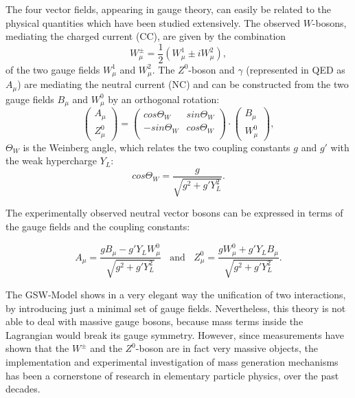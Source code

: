 The four vector fields, appearing in gauge theory, can easily be related to the physical quantities which have been studied extensively. 
The observed $W$-bosons, mediating the charged current (CC), are given by the combination
\begin{equation}\label{EWtrafo1}
 W^{\pm}_\mu = \frac{1}{2}(W^{1}_\mu\pm iW^{2}_\mu),
\end{equation}
of the two gauge fields $W^{1}_\mu$ and $W^{2}_\mu$. The $Z^0$-boson and $\gamma$ (represented in QED as $A_\mu$) are mediating the neutral current (NC) and can be constructed from the two gauge fields $B_{\mu}$ and $W_{\mu}^{0}$ by an orthogonal rotation:
\begin{equation}\label{EWtrafo2}
\begin{pmatrix}
A_\mu\\
Z^0_\mu
\end{pmatrix}
=
\begin{pmatrix}
cos\Theta_W & sin\Theta_ W \\
-sin\Theta_W & cos\Theta_W  \\

\end{pmatrix}
\cdot 
\begin{pmatrix}
B_\mu\\
W^0_\mu
\end{pmatrix},
\end{equation}
 $\Theta_W$ is the Weinberg angle, which relates the two coupling constants $g$ and $g'$ with the weak hypercharge $Y_L$:
\begin{equation}\label{Weinber2}
cos \Theta_W = \frac{g}{\sqrt{g^2+g'Y^2_L}}.
\end{equation} 

The experimentally observed neutral vector bosons can be expressed in terms of the gauge fields and the coupling constants: 

\begin{equation}
A_\mu = \frac{gB_\mu -g'Y_LW_\mu^0}{\sqrt{g^2+g'Y^2_L}} ~~~~\mathrm{and} ~~~~Z_\mu^0 = \frac{gW_\mu^0 +g'Y_LB_\mu}{\sqrt{g^2+g'Y^2_L}}.
\end{equation}

The GSW-Model shows in a very elegant way the unification of two interactions, by introducing just a minimal set of gauge fields. Nevertheless, this theory is not able to deal with massive gauge bosons, because mass terms inside the Lagrangian would break its gauge symmetry. However, since measurements have shown that the $W^\pm$ and the $Z^0$-boson are in fact very massive objects, the implementation and experimental investigation of mass generation mechanisms has been a cornerstone of research in elementary particle physics, over the past decades.

